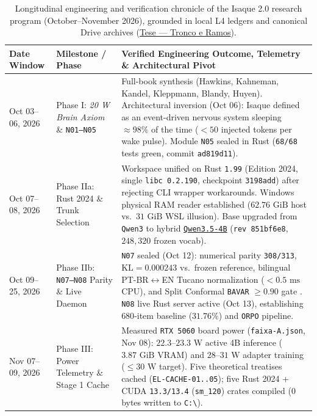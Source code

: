 \documentclass[10pt,a4paper]{article}
\begin{document}
\begin{table}[!htbp]
\centering
\caption{Longitudinal engineering and verification chronicle of the Isaque 2.0 research program (October--November 2026), grounded in local L4 ledgers and canonical Drive archives (\href{https://drive.google.com/drive/folders/1xkl3xJ-djEBjyhXbT3oyg7OfOuUbD1lv}{Tese --- Tronco e Ramos}).}
\label{tab:chronicle}
\footnotesize
\begin{tabularx}{\linewidth}{@{}llY@{}}
\toprule
\textbf{Date Window} & \textbf{Milestone / Phase} & \textbf{Verified Engineering Outcome, Telemetry \& Architectural Pivot} \\
\midrule
Oct 03--06, 2026 & Phase I: \textit{20 W Brain Axiom} \& \texttt{N01--N05} & Full-book synthesis (Hawkins, Kahneman, Kandel, Kleppmann, Blandy, Huyen). Architectural inversion (Oct 06): Isaque defined as an event-driven nervous system sleeping $\approx 98\%$ of the time ($<50$ injected tokens per wake pulse). Module \texttt{N05} sealed in Rust (\texttt{68/68} tests green, commit \texttt{ad819d11}). \\
Oct 07--08, 2026 & Phase IIa: Rust 2024 \& Trunk Selection & Workspace unified on Rust \texttt{1.99} (Edition 2024, single \texttt{libc 0.2.190}, checkpoint \texttt{3198add}) after rejecting CLI wrapper workarounds. Windows physical RAM reader established ($62.76\text{ GiB}$ host vs.\ $31\text{ GiB}$ WSL illusion). Base upgraded from \texttt{Qwen3} to hybrid \href{https://huggingface.co/Qwen/Qwen3.5-4B}{\texttt{Qwen3.5-4B}} (\texttt{rev 851bf6e8}, $248,320$ frozen vocab). \\
Oct 09--25, 2026 & Phase IIb: \texttt{N07--N08} Parity \& Live Daemon & \texttt{N07} sealed (Oct 12): numerical parity \texttt{308/313}, $\mathrm{KL}=0.000243$ vs.\ frozen reference, bilingual PT-BR$\leftrightarrow$EN Tucano normalization ($<0.5\text{ ms}$ CPU), and Split Conformal \texttt{BAVAR} $\ge 0.90$ gate \cite{angelopoulos2023conformal}. \texttt{N08} live Rust server active (Oct 13), establishing $680$-item baseline ($31.76\%$) and \texttt{ORPO} pipeline. \\
Nov 07--09, 2026 & Phase III: Power Telemetry \& Stage 1 Cache & Measured \texttt{RTX 5060} board power (\texttt{faixa-A.json}, Nov 08): \textbf{$22.3\text{--}23.3\text{ W}$} active 4B inference ($3.87\text{ GiB}$ VRAM) and \textbf{$28\text{--}31\text{ W}$} adapter training ($\le 30\text{ W}$ target). Five theoretical treatises cached (\texttt{EL-CACHE-01..05}); five Rust 2024 + CUDA \texttt{13.3/13.4} (\texttt{sm\_\allowbreak{}120}) crates compiled ($0$ bytes written to \texttt{C:\textbackslash}). \\

\end{tabularx}
\end{table}
\end{document}
